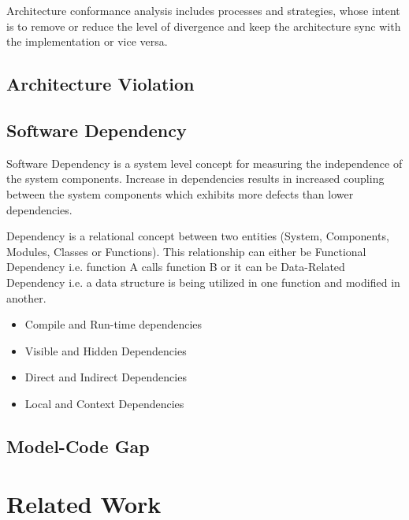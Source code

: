 Architecture conformance analysis includes processes and strategies, whose intent is to remove or reduce the level of divergence and keep the architecture sync with the implementation or vice versa.

\subsection{Architecture Violation}
\subsection{Software Dependency}
Software Dependency is a system level concept for measuring the independence of the system components. Increase in dependencies results in increased coupling between the system components which exhibits more defects than lower dependencies.\newline

Dependency is a relational concept between two entities (System, Components, Modules, Classes or Functions). This relationship can either be Functional Dependency i.e. function A calls function B or it can be Data-Related Dependency i.e. a data structure is being utilized in one function and modified in another.\newline

\begin{itemize}
\item Compile and Run-time dependencies 
\item Visible and Hidden Dependencies
\item Direct and Indirect Dependencies 
\item Local and Context Dependencies  
\end{itemize}

\subsection{Model-Code Gap}

\section{Related Work}